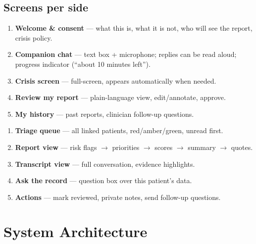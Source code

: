 \documentclass[11pt]{article}
\begin{document}
\subsection{Screens per side}
\begin{minipage}[t]{0.48\textwidth}
\begin{tcolorbox}[colback=patientbg,colframe=patient,title=\textbf{Patient app},boxrule=0.6pt,arc=2pt]
\small
\begin{enumerate}[leftmargin=*]
  \item \textbf{Welcome \& consent} --- what this is, what it is not, who will see the report, crisis policy.
  \item \textbf{Companion chat} --- text box + microphone; replies can be read aloud; progress indicator (``about 10 minutes left'').
  \item \textbf{Crisis screen} --- full-screen, appears automatically when needed.
  \item \textbf{Review my report} --- plain-language view, edit/annotate, approve.
  \item \textbf{My history} --- past reports, clinician follow-up questions.
\end{enumerate}
\end{tcolorbox}
\end{minipage}\hfill
\begin{minipage}[t]{0.48\textwidth}
\begin{tcolorbox}[colback=clinicbg,colframe=clinic,title=\textbf{Clinician app},boxrule=0.6pt,arc=2pt]
\small
\begin{enumerate}[leftmargin=*]
  \item \textbf{Triage queue} --- all linked patients, red/amber/green, unread first.
  \item \textbf{Report view} --- risk flags $\rightarrow$ priorities $\rightarrow$ scores $\rightarrow$ summary $\rightarrow$ quotes.
  \item \textbf{Transcript view} --- full conversation, evidence highlights.
  \item \textbf{Ask the record} --- question box over this patient's data.
  \item \textbf{Actions} --- mark reviewed, private notes, send follow-up questions.
\end{enumerate}
\end{tcolorbox}
\end{minipage}

\section{System Architecture}
\end{document}

